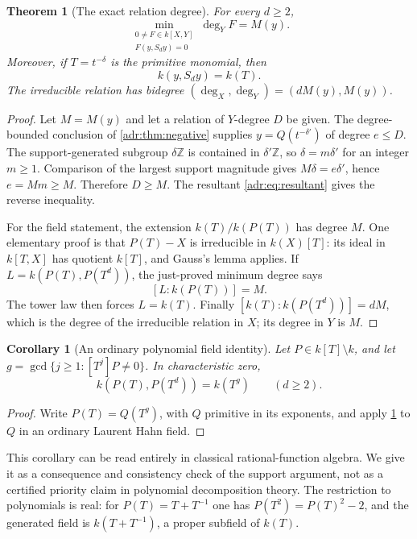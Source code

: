 \documentclass[11pt,letterpaper]{article}
\numberwithin{equation}{section}
\newtheorem{theorem}{Theorem}[section]
\newtheorem{corollary}[corollary]{Corollary}
\theoremstyle{definition}
\theoremstyle{remark}
\newcommand{\Z}{\mathbb Z}
\begin{document}
\begin{theorem}[The exact relation degree]\label{adr:thm:degree}
For every $d\ge2$,
\begin{equation}\label{adr:eq:exact-degree}
 \min_{\substack{0\ne F\in k[X,Y]\\F(y,S_dy)=0}}\deg_YF=M(y).
\end{equation}
Moreover, if $T=t^{-\delta}$ is the primitive monomial, then
\begin{equation}\label{adr:eq:recover}
 k(y,S_dy)=k(T).
\end{equation}
The irreducible relation has bidegree
$(\deg_X,\deg_Y)=(dM(y),M(y))$.
\end{theorem}
\begin{proof}
Let $M=M(y)$ and let a relation of $Y$-degree $D$ be given.
The degree-bounded conclusion of \cref{adr:thm:negative} supplies
$y=Q(t^{-\delta'})$ of degree $e\le D$.
The support-generated subgroup $\delta\Z$ is contained in
$\delta'\Z$, so $\delta=m\delta'$ for an integer $m\ge1$.
Comparison of the largest support magnitude gives
$M\delta=e\delta'$, hence $e=Mm\ge M$. Therefore $D\ge M$.
The resultant \eqref{adr:eq:resultant} gives the reverse inequality.

For the field statement, the extension
$k(T)/k(P(T))$ has degree $M$. One elementary proof is that
$P(T)-X$ is irreducible in $k(X)[T]$: its ideal in $k[T,X]$ has quotient
$k[T]$, and Gauss's lemma applies. If
$L=k(P(T),P(T^d))$, the just-proved minimum degree says
\[
 [L:k(P(T))]=M.
\]
The tower law then forces $L=k(T)$. Finally
$[k(T):k(P(T^d))]=dM$, which is the degree of the irreducible relation
in $X$; its degree in $Y$ is $M$.
\end{proof}

\begin{corollary}[An ordinary polynomial field identity]
\label{adr:cor:polynomial-field}
Let $P\in k[T]\setminus k$, and let
$g=\gcd\{j\ge1:[T^j]P\ne0\}$. In characteristic zero,
\begin{equation}\label{adr:eq:polynomial-field}
 k(P(T),P(T^d))=k(T^g)\qquad(d\ge2).
\end{equation}
\end{corollary}
\begin{proof}
Write $P(T)=Q(T^g)$, with $Q$ primitive in its exponents, and apply
\cref{adr:thm:degree} to $Q$ in an ordinary Laurent Hahn field.
\end{proof}

This corollary can be read entirely in classical rational-function
algebra. We give it as a consequence and consistency check of the support
argument, not as a certified priority claim in polynomial decomposition
theory. The restriction to polynomials is real: for
$P(T)=T+T^{-1}$ one has $P(T^2)=P(T)^2-2$, and the generated field is
$k(T+T^{-1})$, a proper subfield of $k(T)$.
\end{document}
